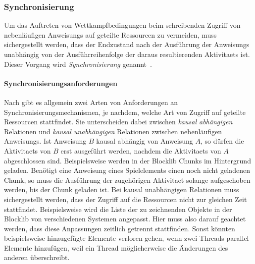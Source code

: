 \subsubsection{Synchronisierung}
Um das Auftreten von Wettkampfbedingungen beim schreibenden Zugriff von nebenläufigen \glspl{Anweisung} auf geteilte Ressourcen zu vermeiden, muss sichergestellt werden, dass der Endzustand nach der Ausführung der \glspl{Anweisung} unabhängig von der Ausführreihenfolge der daraus resultierenden \glspl{Aktivitaet} ist. Dieser Vorgang wird \emph{Synchronisierung} genannt~\cite[S.~4]{Maurer2019}.

\paragraph{Synchronisierungsanforderungen} Nach \textcite[S.~132~\psqq]{Herrtwich1989} gibt es allgemein zwei Arten von Anforderungen an Synchronisierungsmechanismen, je nachdem, welche Art von Zugriff auf geteilte Ressourcen stattfindet. Sie unterscheiden dabei zwischen \emph{kausal abhängigen} Relationen und \emph{kausal unabhängigen} Relationen zwischen nebenläufigen \glspl{Anweisung}. Ist \gls{Anweisung} $B$ kausal abhängig von \gls{Anweisung} $A$, so dürfen die \glspl{Aktivitaet} von $B$ erst ausgeführt werden, nachdem die \glspl{Aktivitaet} von $A$ abgeschlossen sind. Beispielsweise werden in der Blocklib Chunks im Hintergrund geladen. Benötigt eine \gls{Anweisung} eines Spielelements einen noch nicht geladenen Chunk, so muss die Ausführung der zugehörigen \gls{Aktivitaet} solange aufgeschoben werden, bis der Chunk geladen ist. Bei kausal unabhängigen Relationen muss sichergestellt werden, dass der Zugriff auf die Ressourcen nicht zur gleichen Zeit stattfindet.  Beispielsweise wird die Liste der zu zeichnenden Objekte in der Blocklib von verschiedenen Systemen angepasst. Hier muss also darauf geachtet werden, dass diese Anpassungen zeitlich getrennt stattfinden. Sonst könnten beispielsweise hinzugefügte Elemente verloren gehen, wenn zwei Threads parallel Elemente hinzufügen, weil ein Thread möglicherweise die Änderungen des anderen überschreibt.

